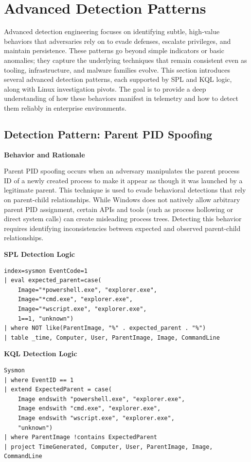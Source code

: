 \section{Advanced Detection Patterns}

Advanced detection engineering focuses on identifying subtle, high‑value behaviors that adversaries rely on to evade defenses, 
escalate privileges, and maintain persistence. These patterns go beyond simple indicators or basic anomalies; 
they capture the underlying techniques that remain consistent even as tooling, infrastructure, and malware families evolve. 
This section introduces several advanced detection patterns, each supported by SPL and KQL logic, along with Linux 
investigation pivots. The goal is to provide a deep understanding of how these behaviors manifest in telemetry and 
how to detect them reliably in enterprise environments.

\subsection*{Detection Pattern: Parent PID Spoofing}

\textbf{Behavior and Rationale}

Parent PID spoofing occurs when an adversary manipulates the parent process ID of a newly created process to make it 
appear as though it was launched by a legitimate parent. This technique is used to evade behavioral detections that rely 
on parent-child relationships. While Windows does not natively allow arbitrary parent PID assignment, certain APIs and 
tools (such as process hollowing or direct system calls) can create misleading process trees. Detecting this behavior 
requires identifying inconsistencies between expected and observed parent-child relationships.

\textbf{SPL Detection Logic}
\begin{lstlisting}
index=sysmon EventCode=1
| eval expected_parent=case(
    Image="*powershell.exe", "explorer.exe",
    Image="*cmd.exe", "explorer.exe",
    Image="*wscript.exe", "explorer.exe",
    1==1, "unknown")
| where NOT like(ParentImage, "%" . expected_parent . "%")
| table _time, Computer, User, ParentImage, Image, CommandLine
\end{lstlisting}

\textbf{KQL Detection Logic}
\begin{lstlisting}
Sysmon
| where EventID == 1
| extend ExpectedParent = case(
    Image endswith "powershell.exe", "explorer.exe",
    Image endswith "cmd.exe", "explorer.exe",
    Image endswith "wscript.exe", "explorer.exe",
    "unknown")
| where ParentImage !contains ExpectedParent
| project TimeGenerated, Computer, User, ParentImage, Image, CommandLine
\end{lstlisting}

